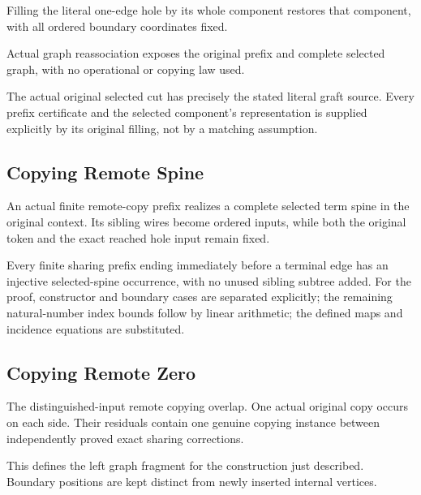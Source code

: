 Filling the literal one-edge hole by its whole component restores that component, with all ordered boundary coordinates fixed.
\par{}

Actual graph reassociation exposes the original prefix and complete selected graph, with no operational or copying law used.
\par{}

The actual original selected cut has precisely the stated literal graft source. Every prefix certificate and the selected component's representation is supplied explicitly by its original filling, not by a matching assumption.
\par{}

\subsection{Copying Remote Spine}
An actual finite remote-copy prefix realizes a complete selected term spine in the original context. Its sibling wires become ordered inputs, while both the original token and the exact reached hole input remain fixed.

Every finite sharing prefix ending immediately before a terminal edge has an injective selected-spine occurrence, with no unused sibling subtree added.
For the proof, constructor and boundary cases are separated explicitly; the remaining natural-number index bounds follow by linear arithmetic; the defined maps and incidence equations are substituted.
\par{}

\subsection{Copying Remote Zero}
The distinguished-input remote copying overlap. One actual original copy occurs on each side. Their residuals contain one genuine copying instance between independently proved exact sharing corrections.

This defines the left graph fragment for the construction just described. Boundary positions are kept distinct from newly inserted internal vertices.
\par{}

